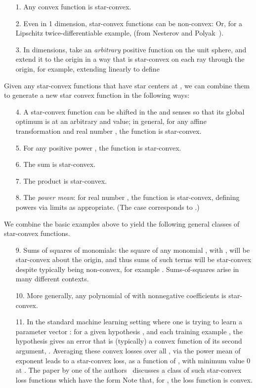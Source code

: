 \documentclass[11pt,letter]{article}
\numberwithin{nTheorems}{section}
\begin{document}
\medskip{}
\begin{itemize}
  \item[1.] Any convex function is star-convex.
  \item[2.] Even in 1 dimension, star-convex functions can be non-convex: 
  Or, for a Lipschitz twice-differentiable example,  (from Nesterov and Polyak~\cite{Nesterov:2006}).
  \item[3.] In  dimensions, take an \emph{arbitrary} positive function  on the unit sphere, and extend it to the origin in a way that is star-convex on each ray through the origin, for example, extending  linearly to define 
\end{itemize}


\medskip{}
Given any star-convex functions  that have star centers at , we can combine them to generate a new star convex function in the following ways:
\begin{itemize}
  \item[4.] A star-convex function can be shifted in the  and  senses so that its global optimum is at an arbitrary  and  value; in general, for any affine transformation  and real number , the function  is star-convex.
  \item[5.] For any positive power , the function  is star-convex.
  \item[6.] The sum  is star-convex.
  \item[7.] The product  is star-convex.
  \item[8.] The \emph{power mean}: for real number , the function  is star-convex, defining powers via limits as appropriate. (The case  corresponds to .)
\end{itemize}

\medskip{}

We combine the basic examples above to yield the following general classes of star-convex functions.

\begin{itemize}
  \item[9.] Sums of squares of monomials: the square of any monomial , with , will be star-convex about the origin, and thus sums of such terms will be star-convex despite typically being non-convex, for example . Sums-of-squares arise in many different contexts.
  \item[10.] More generally, any polynomial of  with nonnegative coefficients is star-convex.
  \item[11.] In the standard machine learning setting where one is trying to learn a parameter vector : for a given hypothesis , and each training example , the hypothesis gives an error  that is (typically) a convex function of its second argument, . Averaging these convex losses over all , via the power mean of exponent  leads to a star-convex loss, as a function of , with minimum value 0 at . The paper by one of the authors~\cite{Valiant:2014} discusses a class of such star-convex loss functions which have the form 
Note that, for , the loss function is convex.
\end{itemize}
\end{document}

